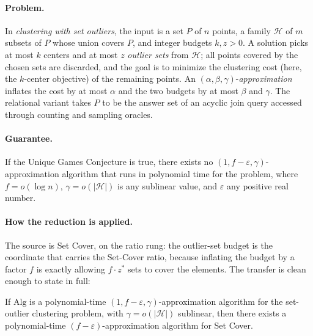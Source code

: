 \paragraph{Problem.}
In \emph{clustering with set outliers}, the input is a set $P$ of $n$ points, a family
$\mathcal{H}$ of $m$ subsets of $P$ whose union covers $P$, and integer budgets
$k, z > 0$. A solution picks at most $k$ centers and at most $z$ \emph{outlier sets}
from $\mathcal{H}$; all points covered by the chosen sets are discarded, and the goal
is to minimize the clustering cost (here, the $k$-center objective) of the remaining
points. An $(\alpha, \beta, \gamma)$-\emph{approximation} inflates the cost by at most
$\alpha$ and the two budgets by at most $\beta$ and $\gamma$. The relational variant
takes $P$ to be the answer set of an acyclic join query accessed through counting and
sampling oracles.


\paragraph{Guarantee.}

\begin{theorem}\label{thm:red-ugc}
If the Unique Games Conjecture is true, there exists no $(1, f - \varepsilon,
\gamma)$-approximation algorithm that runs in polynomial time for the problem, where
$f = o(\log n)$, $\gamma = o(|\mathcal{H}|)$ is any sublinear value, and
$\varepsilon$ any positive real number. \eop
\end{theorem}

\paragraph{How the reduction is applied.}
The source is Set Cover, on the ratio rung: the outlier-set budget is the coordinate
that carries the Set-Cover ratio, because inflating the budget by a factor $f$ is
exactly allowing $f \cdot z^{*}$ sets to cover the elements. The transfer is clean
enough to state in full:

\begin{lemma}\label{lem:red-cover}
If $\mathrm{Alg}$ is a polynomial-time $(1, f - \varepsilon, \gamma)$-approximation
algorithm for the set-outlier clustering problem, with $\gamma = o(|\mathcal{H}|)$
sublinear, then there exists a polynomial-time $(f - \varepsilon)$-approximation
algorithm for Set Cover. \eop
\end{lemma}

